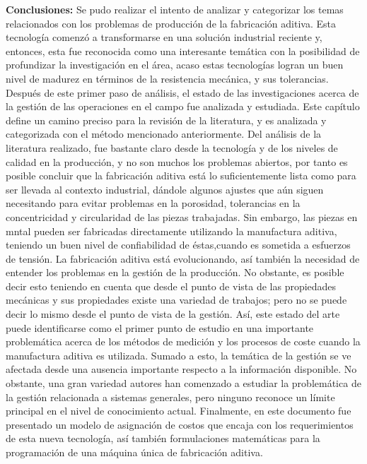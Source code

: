 \begin{description}
\item \textbf{Conclusiones:} Se pudo realizar el intento de analizar y categorizar los temas relacionados con los problemas de producción de la fabricación aditiva. Esta tecnología comenzó a transformarse en una solución industrial reciente y, entonces, esta fue reconocida como una interesante temática con la posibilidad de profundizar la investigación en el área, acaso estas tecnologías logran un buen nivel de madurez en términos de la resistencia mecánica, y sus tolerancias. Después de este primer paso de análisis, el estado de las investigaciones acerca de la gestión de las operaciones en el campo fue analizada y estudiada. Este capítulo define un camino preciso para la revisión de la literatura, y es analizada y categorizada con el método mencionado anteriormente.
Del análisis de la literatura realizado, fue bastante claro desde la tecnología y de los niveles de calidad en la producción, y no son muchos los problemas abiertos, por tanto es posible concluir que la fabricación aditiva está lo suficientemente lista como para ser llevada al contexto industrial, dándole algunos ajustes que aún siguen necesitando para evitar problemas en la porosidad, tolerancias en la concentricidad y circularidad de las piezas trabajadas. Sin embargo, las piezas en mntal pueden ser fabricadas directamente utilizando la manufactura aditiva, teniendo un buen nivel de confiabilidad de éstas,cuando es sometida a esfuerzos de tensión. La fabricación aditiva está evolucionando, así también la necesidad de entender los problemas en la gestión de la producción. No obstante, es posible decir esto teniendo en cuenta que desde el punto de vista de las propiedades mecánicas y sus propiedades existe una variedad de trabajos; pero no se puede decir lo mismo desde el punto de vista de la gestión. Así, este estado del arte puede identificarse como el primer punto de estudio en una importante problemática acerca de los métodos de medición y los procesos de coste cuando la manufactura aditiva es utilizada. Sumado a esto, la temática de la gestión se ve afectada desde una ausencia importante respecto a la información disponible.  No obstante, una gran variedad autores han comenzado a estudiar la problemática de la gestión relacionada a sistemas generales, pero ninguno reconoce un límite principal en el nivel de conocimiento actual. Finalmente, en este documento fue presentado un modelo de asignación de costos que encaja con los requerimientos de esta nueva tecnología, así también formulaciones matemáticas para la programación de una máquina única de fabricación aditiva.   

\end{description}

